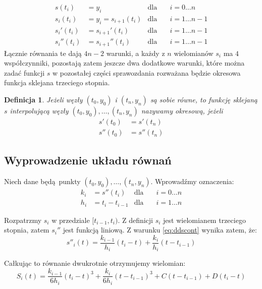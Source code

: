 \documentclass[11pt,wide]{mwart}
\newtheorem{defn}{Definicja}
\begin{document}
\begin{align}	
	s(t_i) &= y_i               		
		& \text{dla} \quad & i = 0 \ldots n   \label{eq:sinter}\\
	s_i(t_{i}) &= y_i = s_{i+1}(t_{i}) 	
		& \text{dla} \quad & i = 1 \ldots n-1 \label{eq:scont}  \\
	s_i'(t_{i}) &= s_{i+1}'(t_i) 		
		& \text{dla} \quad & i = 1 \ldots n-1 \label{eq:dscont} \\
	s_i''(t_{i}) &= s_{i+1}''(t_i) 	    
		& \text{dla} \quad & i = 1 \ldots n-1 \label{eq:ddscont}
\end{align}
Łącznie równania te dają $ 4n - 2 $ warunki, a każdy z $ n $ wielomianów $ s_i $ ma $ 4 $ współczynniki, pozostają zatem jeszcze dwa dodatkowe warunki, które można zadać funkcji $ s $ w pozostałej części sprawozdania rozważana będzie okresowa funkcja sklejana trzeciego stopnia.
\begin{defn} Jeżeli węzły $ (t_0, y_0) $ i $ (t_n, y_n) $ są sobie równe, to funkcję sklejaną $ s $ interpolującą węzły $ (t_0, y_0) , \ldots, (t_n, y_n) $ nazywamy okresową, jeżeli
\begin{align}
s'(t_0) &= s'(t_n) \label{eq:periodic1} \\ 
s''(t_0) &= s''(t_n) \label{eq:periodic2}
\end{align}
\end{defn}

\subsection{Wyprowadzenie układu równań}

Niech dane będą punkty $ (t_0, y_0) , \ldots, (t_n, y_n) $. Wprowadźmy oznaczenia:
\begin{align}
	 k_i &= s''(t_i) & \text{dla} \quad & i = 0 \ldots n \\
	 h_i &= t_i - t_{i-1} & \text{dla} \quad & i = 1 \ldots n
\end{align} 

Rozpatrzmy $ s_i $ w przedziale $ [t_{i-1}, t_{i} ) $. Z definicji $ s_i $ jest wielomianem trzeciego stopnia, zatem $ s_i'' $ jest funkcją liniową. Z warunku \eqref{eq:ddscont} wynika zatem, że:
\begin{equation}
	s''_i(t) = \frac{k_{i-1}}{h_{i}}(t_{i} - t) + \frac{k_{i}}{h_{i}}(t - t_{i-1})
\end{equation}

Całkując to równanie dwukrotnie otrzymujemy wielomian:
\begin{equation}
	S_i(t) = \frac{k_{i-1}}{6h_{i}}(t_{i} - t)^3 + \frac{k_{i}}{6h_{i}}(t - t_{i-1})^3 + C(t - t_{i-1}) + D(t_{i} - t)
\end{equation}
\end{document}
